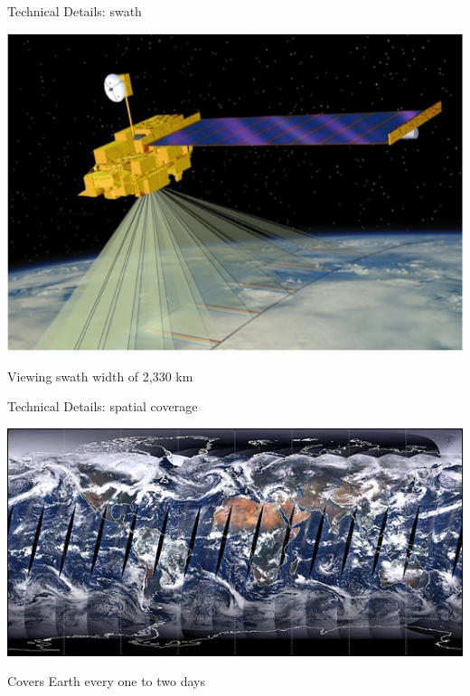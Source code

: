 \documentclass[ignorenonframetext,]{beamer}
\begin{document}
\begin{frame}{Technical Details: swath}

\includegraphics{assets/terra.png}

Viewing swath width of 2,330 km

\end{frame}

\begin{frame}{Technical Details: spatial coverage}

\includegraphics{assets/first_complete_day_from_modis.jpg}

Covers Earth every one to two days

\end{frame}
\end{document}
